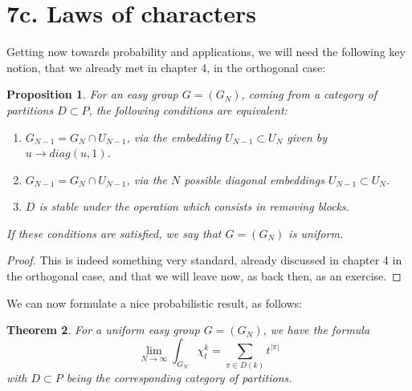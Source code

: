 \documentclass[12pt]{amsbook}
\newtheorem{theorem}{Theorem}[chapter]
\newtheorem{proposition}[theorem]{Proposition}
\begin{document}
\section*{7c. Laws of characters}

Getting now towards probability and applications, we will need the following key notion, that we already met in chapter 4, in the orthogonal case:


\begin{proposition}
For an easy group $G=(G_N)$, coming from a category of partitions $D\subset P$, the following conditions are equivalent:
\begin{enumerate}
\item $G_{N-1}=G_N\cap U_{N-1}$, via the embedding $U_{N-1}\subset U_N$ given by $u\to diag(u,1)$.

\item $G_{N-1}=G_N\cap U_{N-1}$, via the $N$ possible diagonal embeddings $U_{N-1}\subset U_N$.

\item $D$ is stable under the operation which consists in removing blocks.
\end{enumerate}
If these conditions are satisfied, we say that $G=(G_N)$ is uniform.
\end{proposition}

\begin{proof}
This is indeed something very standard, already discussed in chapter 4 in the orthogonal case, and that we will leave now, as back then, as an exercise.
\end{proof}

We can now formulate a nice probabilistic result, as follows:

\begin{theorem}
For a uniform easy group $G=(G_N)$, we have the formula
$$\lim_{N\to\infty}\int_{G_N}\chi_t^k=\sum_{\pi\in D(k)}t^{|\pi|}$$
with $D\subset P$ being the corresponding category of partitions.
\end{theorem}
\end{document}
